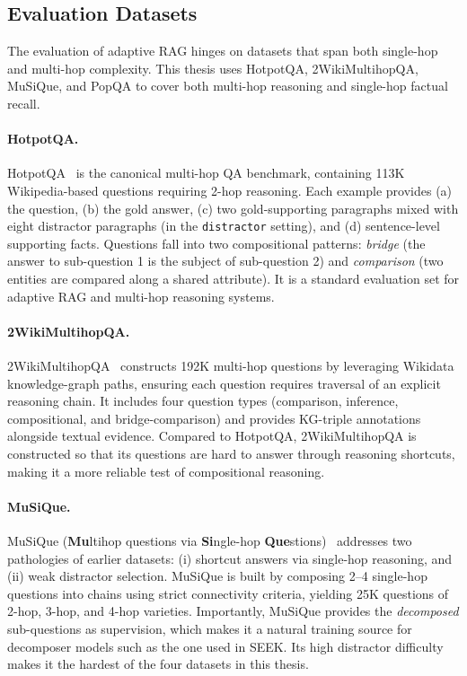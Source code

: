 \documentclass{nthu_thesis}
\begin{document}
\begin{thesiscjk}
\section{Evaluation Datasets}
\label{sec:evaluation-datasets}

The evaluation of adaptive RAG hinges on datasets that span both single-hop and multi-hop complexity. This thesis uses HotpotQA, 2WikiMultihopQA, MuSiQue, and PopQA to cover both multi-hop reasoning and single-hop factual recall.

\paragraph{HotpotQA.}

HotpotQA~\cite{hotpotqa} is the canonical multi-hop QA benchmark, containing 113K Wikipedia-based questions requiring 2-hop reasoning. Each example provides (a) the question, (b) the gold answer, (c) two gold-supporting paragraphs mixed with eight distractor paragraphs (in the \texttt{distractor} setting), and (d) sentence-level supporting facts. Questions fall into two compositional patterns: \emph{bridge} (the answer to sub-question 1 is the subject of sub-question 2) and \emph{comparison} (two entities are compared along a shared attribute). It is a standard evaluation set for adaptive RAG and multi-hop reasoning systems.

\paragraph{2WikiMultihopQA.}

2WikiMultihopQA~\cite{twowiki} constructs 192K multi-hop questions by leveraging Wikidata knowledge-graph paths, ensuring each question requires traversal of an explicit reasoning chain. It includes four question types (comparison, inference, compositional, and bridge-comparison) and provides KG-triple annotations alongside textual evidence. Compared to HotpotQA, 2WikiMultihopQA is constructed so that its questions are hard to answer through reasoning shortcuts, making it a more reliable test of compositional reasoning.

\paragraph{MuSiQue.}

MuSiQue (\textbf{Mu}ltihop questions via \textbf{Si}ngle-hop \textbf{Que}stions)~\cite{musique} addresses two pathologies of earlier datasets: (i) shortcut answers via single-hop reasoning, and (ii) weak distractor selection. MuSiQue is built by composing 2--4 single-hop questions into chains using strict connectivity criteria, yielding 25K questions of 2-hop, 3-hop, and 4-hop varieties. Importantly, MuSiQue provides the \emph{decomposed} sub-questions as supervision, which makes it a natural training source for decomposer models such as the one used in SEEK. Its high distractor difficulty makes it the hardest of the four datasets in this thesis.


\end{thesiscjk}
\end{document}

